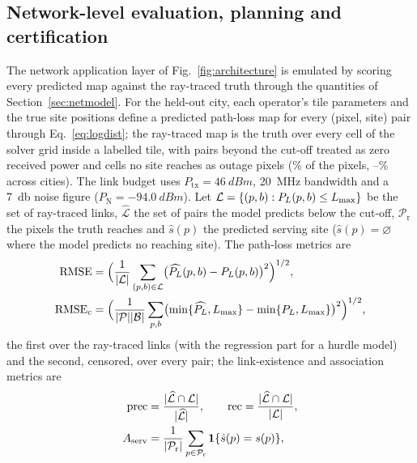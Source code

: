 \subsection{Network-level evaluation, planning and certification}
\label{sec:neteval}

The network application layer of Fig.~\ref{fig:architecture} is emulated by
scoring every predicted map against the ray-traced truth
through the quantities of Section~\ref{sec:netmodel}. For the held-out
city, each operator's tile parameters and the true site positions define a
predicted path-loss map for every (pixel, site) pair through
Eq.~\eqref{eq:logdist}; the ray-traced map is the truth over every cell of
the solver grid inside a labelled tile, with pairs beyond the cut-off
treated as zero received power and cells no site reaches as outage pixels
(\unreachedShare\% of the pixels, \unreachedMin--\unreachedMax\% across
cities). The link budget uses $P_{\mathrm{tx}}=\SI{46}{dBm}$,
\SI{20}{\mega\hertz} bandwidth and a \SI{7}{\decibel} noise figure
($P_{\mathrm{N}}=\SI{-94.0}{dBm}$). Let $\mathcal{L}=\{(p,b):P_{L}(p,b)\le L_{\max}\}$
be the set of ray-traced links, $\widehat{\mathcal{L}}$ the set of pairs the
model predicts below the cut-off, $\mathcal{P}_{\mathrm{r}}$ the pixels the
truth reaches and $\hat s(p)$ the predicted serving site ($\hat s(p)=\varnothing$
where the model predicts no reaching site). The path-loss metrics are
\begin{equation}
\begin{aligned}
\mathrm{RMSE}&=\Bigl(\frac{1}{|\mathcal{L}|}\sum_{(p,b)\in\mathcal{L}}\bigl(\widehat{P_{L}}(p,b)-P_{L}(p,b)\bigr)^{2}\Bigr)^{1/2},\\
\mathrm{RMSE}_{\mathrm{c}}&=\Bigl(\frac{1}{|\mathcal{P}||\mathcal{B}|}\sum_{p,b}\bigl(\min\{\widehat{P_{L}},L_{\max}\}-\min\{P_{L},L_{\max}\}\bigr)^{2}\Bigr)^{1/2},
\end{aligned}
\label{eq:plmetrics}
\end{equation}
the first over the ray-traced links (with the regression part for a hurdle
model) and the second, censored, over every pair; the link-existence and
association metrics are
\begin{equation}
\begin{aligned}
\mathrm{prec}&=\frac{|\widehat{\mathcal{L}}\cap\mathcal{L}|}{|\widehat{\mathcal{L}}|},\qquad
\mathrm{rec}=\frac{|\widehat{\mathcal{L}}\cap\mathcal{L}|}{|\mathcal{L}|},\\
A_{\mathrm{serv}}&=\frac{1}{|\mathcal{P}_{\mathrm{r}}|}\sum_{p\in\mathcal{P}_{\mathrm{r}}}\mathbf{1}\{\hat s(p)=s(p)\},
\end{aligned}
\label{eq:assoc}
\end{equation}
